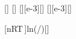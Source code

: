 [\mole]
[\kelvin]
[\liter][e-3][\m\cubed]
[\liter][e-3][\m\cubed]

[nRT\,\ln{}]{\nLuX*\ncRX*\TLX*ln(\VaX/\VbX)}[\joule]
